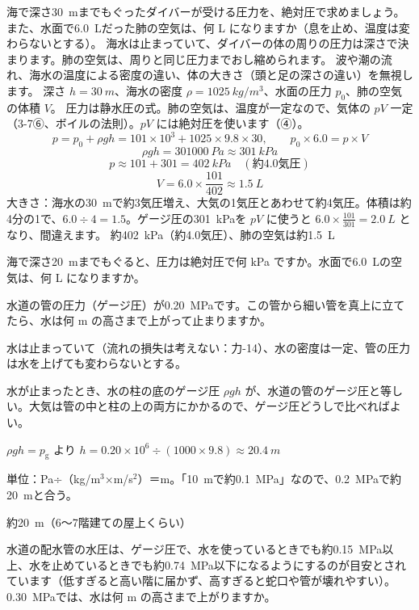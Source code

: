 \begin{phreidai}
\label{ph:力-12:ex3}海で深さ\qty{30}{m}までもぐったダイバーが受ける圧力を、絶対圧で求めましょう。また、水面で\qty{6.0}{L}だった肺の空気は、何 L になりますか（息を止め、温度は変わらないとする）。
\phbamen
海水は止まっていて、ダイバーの体の周りの圧力は深さで決まります。肺の空気は、周りと同じ圧力までおし縮められます。
\phmushi
波や潮の流れ、海水の温度による密度の違い、体の大きさ（頭と足の深さの違い）を無視します。
\phzu
深さ $h=\qty{30}{m}$、海水の密度 $\rho=\qty{1025}{kg/m^3}$、水面の圧力 $p_0$、肺の空気の体積 $V$。
\phriyu
圧力は静水圧の式。肺の空気は、温度が一定なので、気体の $pV$ 一定（3-7⑥、ボイルの法則）。$pV$ には絶対圧を使います（④）。
\phtateru
\[ p=p_0+\rho gh=101\times10^3+1025\times9.8\times30,\qquad p_0\times6.0=p\times V \]
\phtoku
\[ \rho gh=\qty{301000}{Pa}\approx\qty{301}{kPa} \]
\[ p\approx101+301=\qty{402}{kPa}\quad(\text{約4.0気圧}) \]
\[ V=6.0\times\frac{101}{402}\approx\qty{1.5}{L} \]
\phtashikame
大きさ：海水の\qty{30}{m}で約3気圧増え、大気の1気圧とあわせて約4気圧。体積は約4分の1で、$6.0\div4=1.5$。ゲージ圧の\qty{301}{kPa}を $pV$ に使うと $6.0\times\tfrac{101}{301}=\qty{2.0}{L}$ となり、間違えます。
\kotae 約\qty{402}{kPa}（約4.0気圧）、肺の空気は約\qty{1.5}{L}
\end{phreidai}
\begin{jibun}
海で深さ\qty{20}{m}までもぐると、圧力は絶対圧で何 kPa ですか。水面で\qty{6.0}{L}の空気は、何 L になりますか。
\end{jibun}

\begin{reidai}
\label{ph:力-12:ex4}水道の管の圧力（ゲージ圧）が\qty{0.20}{MPa}です。この管から細い管を真上に立てたら、水は何 m の高さまで上がって止まりますか。
\par{} 水は止まっていて（流れの損失は考えない：力-14）、水の密度は一定、管の圧力は水を上げても変わらないとする。
\par\kangaekata 水が止まったとき、水の柱の底のゲージ圧 $\rho gh$ が、水道の管のゲージ圧と等しい。大気は管の中と柱の上の両方にかかるので、ゲージ圧どうしで比べればよい。
\par\shiki $\rho gh=p_{\mathrm{g}}$ より $h=0.20\times10^6\div (1000\times9.8)\approx\qty{20.4}{m}$
\par{} 単位：Pa÷（kg/m$^3$×m/s$^2$）＝m。「\qty{10}{m}で約\qty{0.1}{MPa}」なので、\qty{0.2}{MPa}で約\qty{20}{m}と合う。
\par\kotae 約\qty{20}{m}（6〜7階建ての屋上くらい）
\end{reidai}
\begin{jibun}
水道の配水管の水圧は、ゲージ圧で、水を使っているときでも約\qty{0.15}{MPa}以上、水を止めているときでも約\qty{0.74}{MPa}以下になるようにするのが目安とされています（低すぎると高い階に届かず、高すぎると蛇口や管が壊れやすい）。\qty{0.30}{MPa}では、水は何 m の高さまで上がりますか。
\end{jibun}

